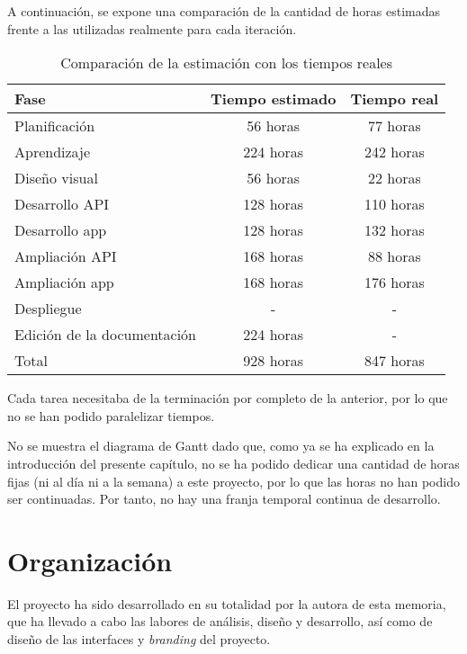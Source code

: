 A continuación, se expone una comparación de la cantidad de horas estimadas
frente a las utilizadas realmente para cada iteración.

\begin{table}[hbtp]
  \centering
  \begin{tabular}{|l|c|c|}
    \hline
    \textbf{Fase} & \textbf{Tiempo estimado} & \textbf{Tiempo real} \\
    \hline
    Planificación & 56 horas & 77 horas \\
    \hline
    Aprendizaje & 224 horas & 242 horas \\
    \hline
    Diseño visual & 56 horas & 22 horas \\
    \hline
    Desarrollo API & 128 horas & 110 horas \\
    \hline
    Desarrollo app & 128 horas & 132 horas \\
    \hline
    Ampliación API & 168 horas & 88 horas \\
    \hline
    Ampliación app & 168 horas & 176 horas \\
    \hline
    Despliegue & - & - \\
    \hline
    Edición de la documentación & 224 horas & - \\
    \hline
    Total & 928 horas & 847 horas \\
    \hline
  \end{tabular}
  \caption{Comparación de la estimación con los tiempos reales}
  \label{tab:estimacion_tiempo}
\end{table}

Cada tarea necesitaba de la terminación por completo de la anterior, por lo que
no se han podido paralelizar tiempos.

No se muestra el diagrama de Gantt dado que, como ya se ha explicado en la
introducción del presente capítulo, no se ha podido dedicar una cantidad de horas
fijas (ni al día ni a la semana) a este proyecto, por lo que las horas no han
podido ser continuadas. Por tanto, no hay una franja temporal continua de
desarrollo.

\section{Organización}

El proyecto ha sido desarrollado en su totalidad por la autora de esta memoria,
que ha llevado a cabo las labores de análisis, diseño y desarrollo, así como de
diseño de las interfaces y \textit{branding} del proyecto.

